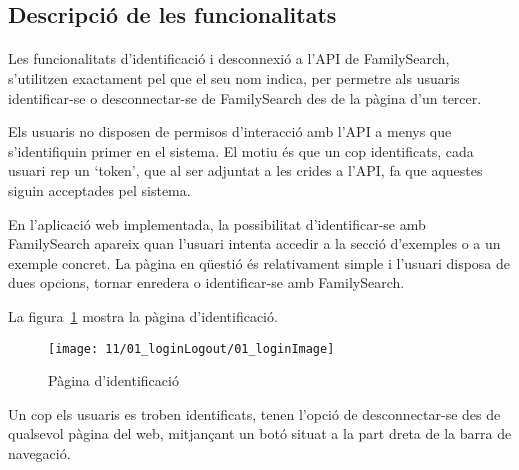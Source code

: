 \subsection{Descripció de les funcionalitats}

    \paragraph{}
    Les funcionalitats d'identificació i desconnexió a l'API de FamilySearch, s'utilitzen exactament pel que el seu nom indica, per permetre als usuaris identificar-se o desconnectar-se de FamilySearch des de la pàgina d'un tercer.

    Els usuaris no disposen de permisos d'interacció amb l'API a menys que s'iden\-ti\-fi\-quin primer en el sistema. El motiu és que un cop identificats, cada usuari rep un `token', que al ser adjuntat a les crides a l'API, fa que aquestes siguin acceptades pel sistema.

    En l'aplicació web implementada, la possibilitat d'identificar-se amb FamilySearch apareix quan l'usuari intenta accedir a la secció d'exemples o a un exemple concret. La pàgina en qüestió és relativament simple i l'usuari disposa de dues opcions, tornar enredera o identificar-se amb FamilySearch.

    La figura~\ref{fig:fsLogin} mostra la pàgina d'identificació.

    \begin{figure}[h]
        \texttt{[image: 11/01\_loginLogout/01\_loginImage]}
        \centering
        \caption{Pàgina d'identificació}\label{fig:fsLogin}
    \end{figure}

    Un cop els usuaris es troben identificats, tenen l'opció de desconnectar-se des de qualsevol pàgina del web, mitjançant un botó situat a la part dreta de la barra de navegació.
